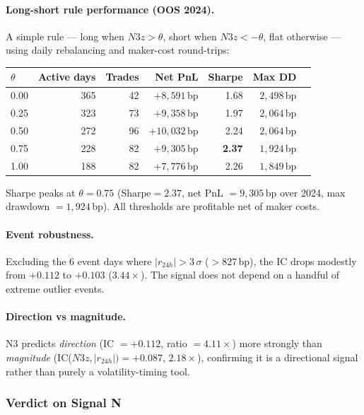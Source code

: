 \documentclass[12pt, a4paper]{article}
\theoremstyle{definition}
\begin{document}
\paragraph{Long-short rule performance (OOS 2024).}
A simple rule --- long when $N3z > \theta$, short when $N3z < -\theta$,
flat otherwise --- using daily rebalancing and maker-cost round-trips:

\begin{center}
\begin{tabular}{lrrrrrr}
\toprule
$\theta$ & Active days & Trades & Net PnL & Sharpe & Max DD \\
\midrule
0.00 & 365 & 42  & $+8{,}591$\,bp & 1.68 & $2{,}498$\,bp \\
0.25 & 323 & 73  & $+9{,}358$\,bp & 1.97 & $2{,}064$\,bp \\
0.50 & 272 & 96  & $+10{,}032$\,bp & 2.24 & $2{,}064$\,bp \\
0.75 & 228 & 82  & $+9{,}305$\,bp & \textbf{2.37} & $1{,}924$\,bp \\
1.00 & 188 & 82  & $+7{,}776$\,bp & 2.26 & $1{,}849$\,bp \\
\bottomrule
\end{tabular}
\end{center}

\noindent Sharpe peaks at $\theta = 0.75$ ($\text{Sharpe} = 2.37$, net PnL
$= 9{,}305$\,bp over 2024, max drawdown $= 1{,}924$\,bp).  All thresholds
are profitable net of maker costs.

\paragraph{Event robustness.}
Excluding the 6 event days where $|r_{24h}| > 3\,\sigma$ ($> 827$\,bp),
the IC drops modestly from $+0.112$ to $+0.103$ ($3.44\times$).  The signal
does not depend on a handful of extreme outlier events.

\paragraph{Direction vs magnitude.}
N3 predicts \emph{direction} (IC $= +0.112$, ratio $= 4.11\times$) more
strongly than \emph{magnitude} (IC($N3z, |r_{24h}|) = +0.087$, $2.18\times$),
confirming it is a directional signal rather than purely a volatility-timing
tool.

\subsubsection{Verdict on Signal N}
\end{document}

